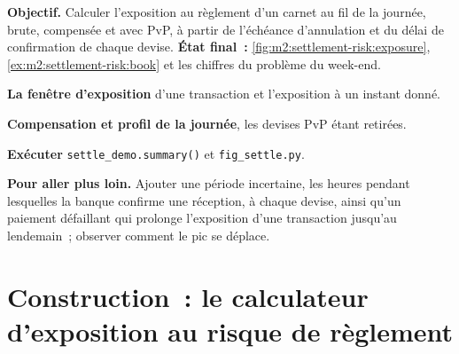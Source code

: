 \begin{tutorial}
\textbf{Objectif.} Calculer l'exposition au règlement d'un carnet au fil de la journée, brute, compensée
et avec PvP, à partir de l'échéance d'annulation et du délai de confirmation de chaque devise.
\textbf{État final~:} \cref{fig:m2:settlement-risk:exposure},
\cref{ex:m2:settlement-risk:book} et les chiffres du problème du week-end.
\begin{tutsteps}
\item \textbf{La fenêtre d'exposition} d'une transaction et l'exposition à un instant donné.
\label{lst:m2:settlement-risk:window}
\item \textbf{Compensation et profil de la journée}, les devises PvP étant retirées.
\label{lst:m2:settlement-risk:profile}
\item \textbf{Exécuter} \texttt{settle\_demo.summary()} et \texttt{fig\_settle.py}.
\end{tutsteps}
\textbf{Pour aller plus loin.} Ajouter une période incertaine, les heures pendant lesquelles la banque
confirme une réception, à chaque devise, ainsi qu'un paiement défaillant qui prolonge l'exposition d'une transaction
jusqu'au lendemain~; observer comment le pic se déplace.
\end{tutorial}

\section{Construction~: le calculateur d'exposition au risque de règlement}\label{bld:m2:settlement-risk:settlerisk}


